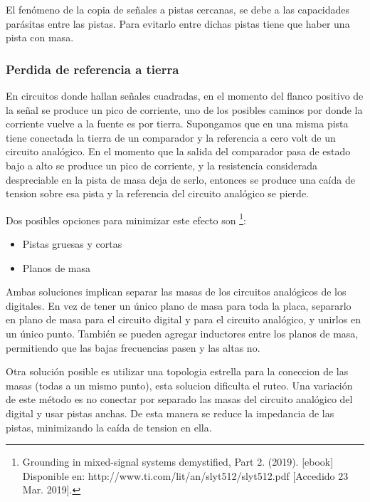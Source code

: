 \documentclass[../../ASSD_TP1_G7.tex]{subfiles}
\begin{document}
\par El fenómeno de la copia de se\~nales a pistas cercanas, se debe a las capacidades parásitas entre las pistas. Para evitarlo entre dichas  pistas tiene que haber una pista con masa.
\subsubsection*{Perdida de referencia a tierra}
 En circuitos donde hallan se\~nales cuadradas, en el momento del flanco positivo de la señal se produce un pico de corriente, uno de los posibles caminos por donde la corriente vuelve a la fuente es por tierra. Supongamos que en una misma pista tiene conectada la tierra de un comparador y la referencia a cero volt de un circuito analógico. En el momento que la salida del comparador pasa de estado bajo a alto se produce un pico de corriente, y la resistencia considerada despreciable en la pista de masa deja de serlo, entonces se produce una caída de tension sobre esa pista y la referencia del circuito analógico se pierde. 
 \par Dos posibles opciones para minimizar este efecto son
 \footnote{Grounding in mixed-signal systems demystified, Part 2. (2019). [ebook] Disponible en: http://www.ti.com/lit/an/slyt512/slyt512.pdf [Accedido 23 Mar. 2019].}:
 \begin{itemize}
  \item Pistas gruesas y cortas
  \item Planos de masa 
\end{itemize}
Ambas soluciones implican separar las masas de los circuitos analógicos de los digitales.
En vez de tener un único plano de masa para toda la placa, separarlo en plano de masa para el circuito digital y para el circuito analógico, y unirlos en un único punto. También se pueden agregar inductores entre los planos de masa, permitiendo que las bajas frecuencias pasen y las altas no.
\par Otra solución posible es utilizar una topologia estrella para la coneccion de las masas (todas a un mismo punto), esta solucion dificulta el ruteo. Una variación de este método es no conectar por separado las masas del circuito analógico del digital y usar pistas anchas. De esta manera se reduce la impedancia de las pistas, minimizando la caída de tension en ella.
\end{document}
